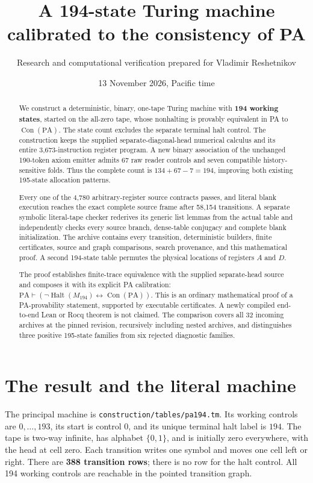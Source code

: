 \documentclass[11pt,letterpaper]{article}
\title{A 194-state Turing machine\\calibrated to the consistency of PA}
\author{Research and computational verification prepared for Vladimir Reshetnikov}
\date{13 November 2026, Pacific time}
\newcommand{\PA}{\mathrm{PA}}
\newcommand{\Con}{\operatorname{Con}}
\newcommand{\file}[1]{\texttt{\nolinkurl{#1}}}
\newcommand{\MX}{M_{194}}
\begin{document}
\maketitle
\begin{abstract}
We construct a deterministic, binary, one-tape Turing machine with
\textbf{194 working states}, started on the all-zero tape, whose nonhalting
is provably equivalent in PA to $\Con(\PA)$. The state count excludes the
separate terminal halt control. The construction keeps the supplied
separate-diagonal-head numerical calculus and its entire 3,673-instruction
register program. A new binary association of the unchanged 190-token
axiom emitter admits 67 raw reader controls and seven compatible
history-sensitive folds. Thus the complete count is
$134+67-7=194$, improving both existing 195-state allocation patterns.

Every one of the 4,780 arbitrary-register source contracts passes, and
literal blank execution reaches the exact complete source frame after
58,154 transitions. A separate symbolic literal-tape checker rederives its
generic list lemmas from the actual table and independently checks every
source branch, dense-table conjugacy and complete blank initialization.
The archive contains every transition, deterministic builders, finite
certificates, source and graph comparisons, search provenance, and this
mathematical proof. A second 194-state table permutes the physical locations
of registers $A$ and $D$.

The proof establishes finite-trace equivalence with the supplied
separate-head source and composes it with its explicit PA calibration:
$\PA\vdash(\neg\operatorname{Halt}(\MX)\leftrightarrow\Con(\PA))$.
This is an ordinary mathematical proof of a PA-provability statement,
supported by executable certificates. A newly compiled end-to-end Lean
or Rocq theorem is not claimed. The comparison covers all 32 incoming
archives at the pinned revision, recursively including nested archives,
and distinguishes three positive 195-state families from six rejected
diagnostic families.
\end{abstract}
\clearpage
\tableofcontents
\newpage

\section{The result and the literal machine}
\label{sec:result}

The principal machine is \file{construction/tables/pa194.tm}.
Its working controls are $0,\ldots,193$, its start is control $0$, and
its unique terminal halt label is $194$. The tape is two-way infinite,
has alphabet $\{0,1\}$, and is initially zero everywhere, with the head
at cell zero. Each transition writes one symbol and moves one cell left
or right. There are \textbf{388 transition rows}; there is no row for
the halt control. All 194 working controls are reachable in the pointed
transition graph.
\end{document}
